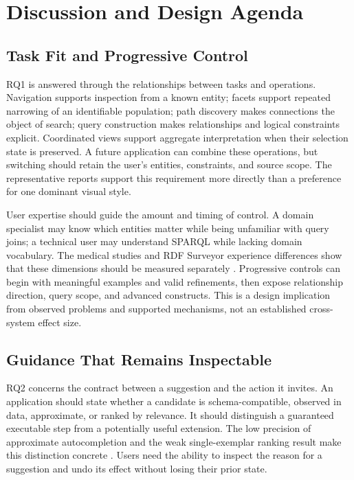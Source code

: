 \documentclass[manuscript,review,screen]{acmart}
\begin{document}
\section{Discussion and Design Agenda}
\subsection{Task Fit and Progressive Control}
RQ1 is answered through the relationships between tasks and operations. Navigation supports inspection from a known entity; facets support repeated narrowing of an identifiable population; path discovery makes connections the object of search; query construction makes relationships and logical constraints explicit. Coordinated views support aggregate interpretation when their selection state is preserved. A future application can combine these operations, but switching should retain the user's entities, constraints, and source scope. The representative reports support this requirement more directly than a preference for one dominant visual style.

User expertise should guide the amount and timing of control. A domain specialist may know which entities matter while being unfamiliar with query joins; a technical user may understand SPARQL while lacking domain vocabulary. The medical studies and RDF Surveyor experience differences show that these dimensions should be measured separately \citep{2021_Witschel_Natural_Language-based,2022_Grether_Studying_Interaction,V3-01765}. Progressive controls can begin with meaningful examples and valid refinements, then expose relationship direction, query scope, and advanced constructs. This is a design implication from observed problems and supported mechanisms, not an established cross-system effect size.

\subsection{Guidance That Remains Inspectable}
RQ2 concerns the contract between a suggestion and the action it invites. An application should state whether a candidate is schema-compatible, observed in data, approximate, or ranked by relevance. It should distinguish a guaranteed executable step from a potentially useful extension. The low precision of approximate autocompletion and the weak single-exemplar ranking result make this distinction concrete \citep{2021_Parra_Fast_Approximate,2020_Lissandrini_Graph-Query_Suggestions}. Users need the ability to inspect the reason for a suggestion and undo its effect without losing their prior state.
\end{document}
